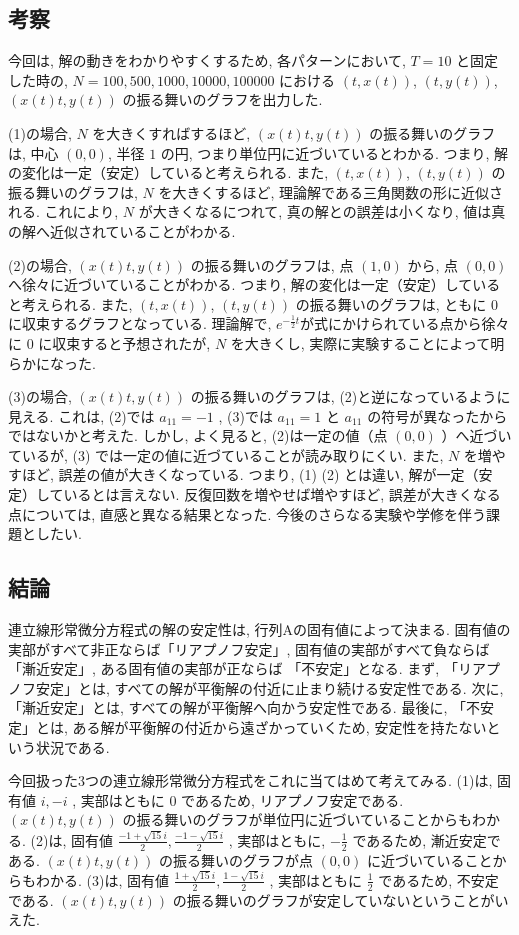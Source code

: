 \documentclass[11pt]{jsarticle}
\begin{document}
\subsection{考察}
今回は, 解の動きをわかりやすくするため, 各パターンにおいて, $T = 10$ と固定した時の, $N = 100, 500, 1000, 10000, 100000$ における $(t, x(t))$, $(t, y(t))$, $(x(t)t, y(t))$ の振る舞いのグラフを出力した. \par
(1)の場合, $N$ を大きくすればするほど, $(x(t)t, y(t))$ の振る舞いのグラフは, 中心 $(0, 0)$, 半径 $1$ の円, つまり単位円に近づいているとわかる. つまり, 解の変化は一定（安定）していると考えられる. また, $(t, x(t))$, $(t, y(t))$ の振る舞いのグラフは, $N$ を大きくするほど, 理論解である三角関数の形に近似される. これにより, $N$ が大きくなるにつれて, 真の解との誤差は小くなり, 値は真の解へ近似されていることがわかる. \par
(2)の場合, $(x(t)t, y(t))$ の振る舞いのグラフは, 点 $(1, 0)$ から, 点 $(0, 0)$  へ徐々に近づいていることがわかる. つまり, 解の変化は一定（安定）していると考えられる. また, $(t, x(t))$, $(t, y(t))$ の振る舞いのグラフは, ともに $0$ に収束するグラフとなっている. 理論解で, $e^{-\frac{1}{2}t}$が式にかけられている点から徐々に $0$ に収束すると予想されたが, $N$ を大きくし, 実際に実験することによって明らかになった. \par
(3)の場合, $(x(t)t, y(t))$ の振る舞いのグラフは, (2)と逆になっているように見える. これは, (2)では $a_{11} = -1$ , (3)では $a_{11} = 1$ と $a_{11}$ の符号が異なったからではないかと考えた. しかし, よく見ると, (2)は一定の値（点 $(0, 0)$ ）へ近づいているが, (3) では一定の値に近づていることが読み取りにくい. また, $N$ を増やすほど, 誤差の値が大きくなっている. つまり, (1) (2) とは違い, 解が一定（安定）しているとは言えない. 反復回数を増やせば増やすほど, 誤差が大きくなる点については, 直感と異なる結果となった. 今後のさらなる実験や学修を伴う課題としたい. 


\subsection{結論}
連立線形常微分方程式の解の安定性は, 行列Aの固有値によって決まる. 固有値の実部がすべて非正ならば「リアプノフ安定」, 固有値の実部がすべて負ならば 「漸近安定」, ある固有値の実部が正ならば 「不安定」となる. 
まず, 「リアプノフ安定」とは, すべての解が平衡解の付近に止まり続ける安定性である. 次に, 「漸近安定」とは, すべての解が平衡解へ向かう安定性である. 最後に, 「不安定」とは, ある解が平衡解の付近から遠ざかっていくため, 安定性を持たないという状況である. \par
今回扱った3つの連立線形常微分方程式をこれに当てはめて考えてみる. (1)は, 固有値 $i, -i$ , 実部はともに $0$ であるため, リアプノフ安定である. $(x(t)t, y(t))$ の振る舞いのグラフが単位円に近づいていることからもわかる. (2)は, 固有値 $\frac{-1+\sqrt{15}i}{2}, \frac{-1-\sqrt{15}i}{2}$ , 実部はともに, $-\frac{1}{2}$ であるため, 漸近安定である. $(x(t)t, y(t))$ の振る舞いのグラフが点 $(0, 0)$ に近づいていることからもわかる. (3)は, 固有値 $\frac{1+\sqrt{15}i}{2}, \frac{1-\sqrt{15}i}{2}$ , 実部はともに $\frac{1}{2}$ であるため, 不安定である. $(x(t)t, y(t))$ の振る舞いのグラフが安定していないということがいえた. 
\end{document}
